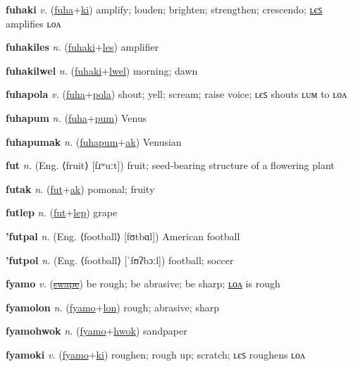 \textbf{\hypertarget{fuhaki}{fuhaki}} \textit{v.} (\hyperlink{fuha}{fuha}+\allowbreak \hyperlink{ki}{ki})
amplify; louden; brighten; strengthen; crescendo; \hyperlink{fuhakiles}{ʟєꜱ} amplifies ʟᴏᴧ

\textbf{\hypertarget{fuhakiles}{fuhakiles}} \textit{n.} (\hyperlink{fuhaki}{fuhaki}+\allowbreak \hyperlink{les}{les})
amplifier

\textbf{\hypertarget{fuhakilwel}{fuhakilwel}} \textit{n.} (\hyperlink{fuhaki}{fuhaki}+\allowbreak \hyperlink{lwel}{lwel})
morning; dawn

\textbf{\hypertarget{fuhapola}{fuhapola}} \textit{v.} (\hyperlink{fuha}{fuha}+\allowbreak \hyperlink{pola}{pola})
shout; yell; scream; raise voice; ʟєꜱ shouts ʟᴜᴍ to ʟᴏᴧ

\textbf{\hypertarget{fuhapum}{fuhapum}} \textit{n.} (\hyperlink{fuha}{fuha}+\allowbreak \hyperlink{pum}{pum})
Venus

\textbf{\hypertarget{fuhapumak}{fuhapumak}} \textit{n.} (\hyperlink{fuhapum}{fuhapum}+\allowbreak \hyperlink{ak}{ak})
Venusian

\textbf{\hypertarget{fut}{fut}} \textit{n.} (Eng. ⟨fruit⟩ [fɹʷuːt])
fruit; seed-bearing structure of a flowering plant

\textbf{\hypertarget{futak}{futak}} \textit{n.} (\hyperlink{fut}{fut}+\allowbreak \hyperlink{ak}{ak})
pomonal; fruity

\textbf{\hypertarget{futlep}{futlep}} \textit{n.} (\hyperlink{fut}{fut}+\allowbreak \hyperlink{lep}{lep})
grape

\textbf{\hypertarget{'futpal}{'futpal}} \textit{n.} (Eng. ⟨football⟩ [fʊtbɑl])
American football

\textbf{\hypertarget{'futpol}{'futpol}} \textit{n.} (Eng. ⟨football⟩ [ˈfʊʔbɔːl])
football; soccer

\textbf{\hypertarget{fyamo}{fyamo}} \textit{v.} (\hyperlink{swape}{\sout{swape}})
be rough; be abrasive; be sharp; \hyperlink{fyamolon}{ʟᴏᴧ} is rough

\textbf{\hypertarget{fyamolon}{fyamolon}} \textit{n.} (\hyperlink{fyamo}{fyamo}+\allowbreak \hyperlink{lon}{lon})
rough; abrasive; sharp

\textbf{\hypertarget{fyamohwok}{fyamohwok}} \textit{n.} (\hyperlink{fyamo}{fyamo}+\allowbreak \hyperlink{hwok}{hwok})
sandpaper

\textbf{\hypertarget{fyamoki}{fyamoki}} \textit{v.} (\hyperlink{fyamo}{fyamo}+\allowbreak \hyperlink{ki}{ki})
roughen; rough up; scratch; ʟєꜱ roughens ʟᴏᴧ

